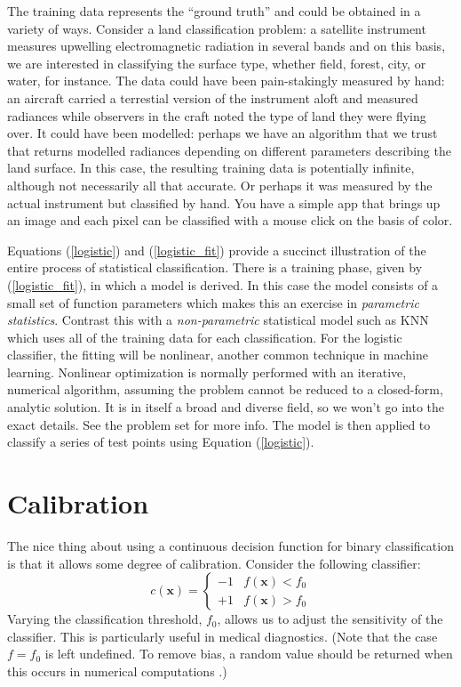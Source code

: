 \documentclass{article}
\renewcommand{\vec}[1]{\boldsymbol{#1}}
\begin{document}
The training data represents the ``ground truth'' and could be obtained in
a variety of ways.
Consider a land classification problem: 
a satellite instrument measures upwelling electromagnetic radiation in several
bands and
on this basis, we are interested in classifying the
surface type, whether field, forest, city, or water, for instance.
The data could have been pain-stakingly measured by hand: an aircraft
carried a terrestial version of the instrument aloft and measured radiances
while observers in the craft noted the type of land they were flying over.
It could have been modelled: perhaps we have an algorithm that we trust that
returns modelled radiances depending on different parameters describing the
land surface.
In this case, the resulting training data is potentially infinite, although
not necessarily all that accurate.
Or perhaps it was measured by the actual instrument but classified by hand.
You have a simple app that brings up an image and each pixel can be classified
with a mouse click on the basis of color.

Equations (\ref{logistic}) and (\ref{logistic_fit}) provide a succinct
illustration of the entire process of statistical classification.
There is a training phase, given by (\ref{logistic_fit}), in which a model is
derived.
In this case the model consists of a small set of function parameters which
makes this an exercise in {\it parametric statistics}.
Contrast this with a {\it non-parametric} statistical model such as KNN
 which uses all of the training data for each classification.
For the logistic classifier, the fitting will be nonlinear, another common technique in machine learning.
Nonlinear optimization is normally performed with an iterative, numerical
algorithm, assuming the problem cannot be reduced to a closed-form, analytic
solution.
It is in itself a broad and diverse field, so we won't
go into the exact details.
See the problem set for more info.
The model is then applied to classify a series of test points using
Equation (\ref{logistic}).

\section{Calibration}

The nice thing about using a continuous decision function for binary
classification is that it allows some degree of calibration.
Consider the following classifier:
\begin{equation}
	c(\vec x) = \left \lbrace \begin{array}{rl}
		-1 & f(\vec x) < f_0 \\
		+1 & f(\vec x) > f_0
	\end{array} \right .
\end{equation}
Varying the classification threshold, $f_0$, 
allows us to adjust the sensitivity of the classifier.
This is particularly useful in medical diagnostics.
(Note that the case $f=f_0$ is left undefined. 
To remove bias,
a random value should be returned
when this occurs in numerical computations
.) 
\end{document}
